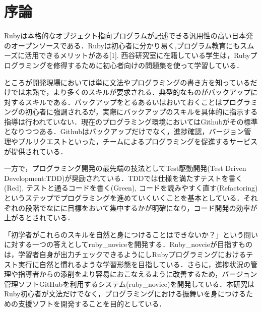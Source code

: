 \section{序論}
Rubyは本格的なオブジェクト指向プログラムが記述できる汎用性の高い日本発のオープンソースである．Rubyは初心者に分かり易く,プログラム教育にもスムーズに活用できるメリットがある[1]. 西谷研究室に在籍している学生は，Rubyプログラミングを修得するために初心者向けの問題集を使って学習している．

ところが開発現場においては単に文法やプログラミングの書き方を知っているだけでは未熟で，より多くのスキルが要求される．典型的なものがバックアップに対するスキルである．バックアップをとるあるいはおいておくことはプログラミングの初心者に強調されるが，実際にバックアップのスキルを具体的に指示する指導は行われていない．現在のプログラミング環境においてはGithubがその標準となりつつある．Githubはバックアップだけでなく，進捗確認，バージョン管理やプルリクエストといった，チームによるプログラミングを促進するサービスが提供されている．

一方で，プログラミング開発の最先端の技法としてTest駆動開発(Test Driven Development:TDD)が奨励されている．TDDでは仕様を満たすテストを書く(Red), テストと通るコードを書く(Green), コードを読みやすく直す(Refactoring)というステップでプログラミングを進めていくいくことを基本としている．それぞれの段階でなにに目標をおいて集中するかが明確になり，コード開発の効率が上がるとされている．

「初学者がこれらのスキルを自然と身につけることはできないか？」という問いに対する一つの答えとしてruby\_noviceを開発する．Ruby\_novcieが目指すものは，学習者自身が出力チェックできるようにしRubyプログラミングにおけるテスト実行に自然と慣れるような学習形態を目指している．さらに，進捗状況の管理や指導者からの添削をより容易におこなえるように改善するため，バージョン管理ソフトGitHubを利用するシステム(ruby\_novice)を開発している．本研究はRuby初心者が文法だけでなく，プログラミングにおける振舞いを身につけるための支援ソフトを開発することを目的としている．

